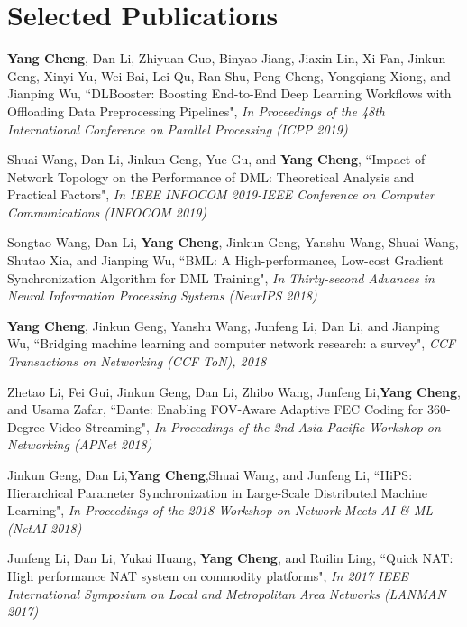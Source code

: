 \documentclass{resume}
\newcommand{\authorlist}[1]{{\textcolor[rgb]{0,0,0}{#1}}}
\newcommand{\papertitle}[1]{{``#1"}}
\newcommand{\publicationaddr}[1]{{\textit{#1}}}
\begin{document}
\section{Selected Publications}

\begin{enumerate}[label={[\arabic*]}, noitemsep]
	\item \authorlist{\textbf{Yang Cheng}, Dan Li, Zhiyuan Guo, Binyao Jiang, Jiaxin Lin, Xi Fan, Jinkun Geng, Xinyi Yu, Wei Bai, Lei Qu, Ran Shu, Peng Cheng, Yongqiang Xiong, and Jianping Wu}, \papertitle{DLBooster: Boosting End-to-End Deep Learning Workflows with Offloading Data Preprocessing Pipelines}, \publicationaddr{In Proceedings of the 48th International Conference on Parallel Processing (ICPP 2019)}
	\item \authorlist{Shuai Wang, Dan Li, Jinkun Geng, Yue Gu, and \textbf{Yang Cheng}}, \papertitle{Impact of Network Topology on the Performance of DML: Theoretical Analysis and Practical Factors}, \publicationaddr{In IEEE INFOCOM 2019-IEEE Conference on Computer Communications (INFOCOM 2019)}
	\item \authorlist{Songtao Wang, Dan Li, \textbf{Yang Cheng}, Jinkun Geng, Yanshu Wang, Shuai Wang, Shutao Xia, and Jianping Wu}, \papertitle{BML: A High-performance, Low-cost Gradient Synchronization Algorithm for DML Training}, \publicationaddr{In Thirty-second Advances in Neural Information Processing Systems (NeurIPS 2018)}
	\item \authorlist{\textbf{Yang Cheng}, Jinkun Geng, Yanshu Wang, Junfeng Li, Dan Li, and Jianping Wu}, \papertitle{Bridging machine learning and computer network research: a survey}, \publicationaddr{CCF Transactions on Networking (CCF ToN), 2018}
	\item \authorlist{Zhetao Li, Fei Gui, Jinkun Geng, Dan Li, Zhibo Wang, Junfeng Li,\textbf{Yang Cheng}, and Usama Zafar}, \papertitle{Dante: Enabling FOV-Aware Adaptive FEC Coding for 360-Degree Video Streaming}, \publicationaddr{In Proceedings of the 2nd Asia-Pacific Workshop on Networking  (APNet 2018)}
	\item \authorlist{Jinkun Geng, Dan Li,\textbf{Yang Cheng},Shuai Wang, and Junfeng Li}, \papertitle{HiPS: Hierarchical Parameter Synchronization in Large-Scale Distributed Machine Learning}, \publicationaddr{In Proceedings of the 2018 Workshop on Network Meets AI \& ML (NetAI 2018)}
	\item \authorlist{Junfeng Li, Dan Li, Yukai Huang, \textbf{Yang Cheng}, and Ruilin Ling}, \papertitle{Quick NAT: High performance NAT system on commodity platforms}, \publicationaddr{In 2017 IEEE International Symposium on Local and Metropolitan Area Networks (LANMAN 2017)}
\end{enumerate}
\end{document}
